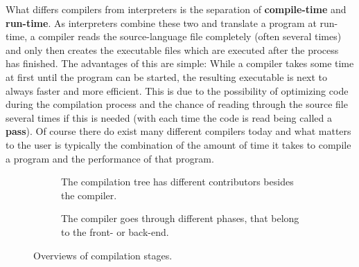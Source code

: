 {What differs compilers from interpreters is the separation of \textbf{compile-time} and \textbf{run-time}.
As interpreters combine these two and translate a program at run-time, a compiler reads the source-language file completely (often several times) and only then creates the executable files which are executed after the process has finished.
The advantages of this are simple:
While a compiler takes some time at first until the program can be started, the resulting executable is next to always faster and more efficient.
This is due to the possibility of optimizing code during the compilation process and the chance of reading through the source file several times if this is needed (with each time the code is read being called a \textbf{pass}).
Of course there do exist many different compilers today and what matters to the user is typically the combination of the amount of time it takes to compile a program and the performance of that program.
\begin{figure}[htb]
    \centering
    \begin{subfigure}[t]{0.25\textwidth}
        
        \caption{\label{fig:cmpstruct} The compilation tree has different contributors besides the compiler.}
    \end{subfigure} \hspace{2cm}
    \begin{subfigure}[t]{0.37\textwidth}
        
        \caption{\label{fig:cmpintstruct} The compiler goes through different phases, that belong to the front- or back-end.}
    \end{subfigure}
    \caption{\label{fig:cmp} Overviews of compilation stages.}
\end{figure}

}
